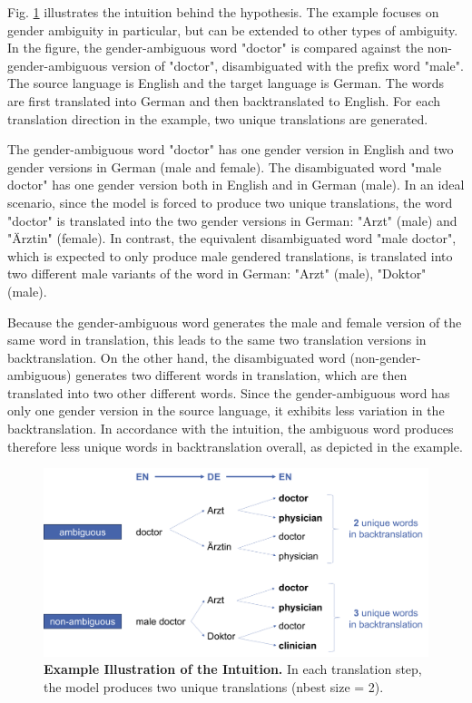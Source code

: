 Fig. \ref{fig:intuition} illustrates the intuition behind the hypothesis. The example focuses on gender ambiguity in particular, but can be extended to other types of ambiguity. In the figure, the gender-ambiguous word "doctor" is compared against the non-gender-ambiguous version of "doctor", disambiguated with the prefix word "male". The source language is English and the target language is German. The words are first translated into German and then backtranslated to English. For each translation direction in the example, two unique translations are generated. 

The gender-ambiguous word "doctor" has one gender version in English and two gender versions in German (male and female). The disambiguated word "male doctor" has one gender version both in English and in German (male). In an ideal scenario, since the model is forced to produce two unique translations, the word "doctor" is translated into the two gender versions in German: "Arzt" (male) and "Ärztin" (female). In contrast, the equivalent disambiguated word "male doctor", which is expected to only produce male gendered translations, is translated into two different male variants of the word in German: "Arzt" (male), "Doktor" (male). 

Because the gender-ambiguous word generates the male and female version of the same word in translation, this leads to the same two translation versions in backtranslation. On the other hand, the disambiguated word (non-gender-ambiguous) generates two different words in translation, which are then translated into two other different words. Since the gender-ambiguous word has only one gender version in the source language, it exhibits less variation in the backtranslation. In accordance with the intuition, the ambiguous word produces therefore less unique words in backtranslation overall, as depicted in the example.


\begin{figure}
  \centering
  \includegraphics[scale=0.45]{figures/intuition.png}
  \caption{\textbf{Example Illustration of the Intuition.} In each translation step, the model produces two unique translations (nbest size = 2).}
  \label{fig:intuition}
\end{figure}


